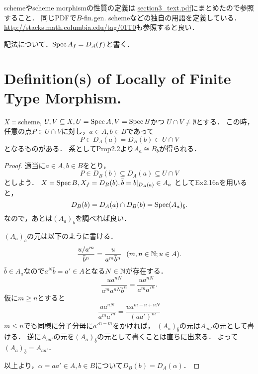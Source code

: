 \documentclass[a4paper]{jsarticle}
\begin{document}
    schemeやscheme morphismの性質の定義は
    \url{section3_text.pdf}にまとめたので参照すること．
    同じPDFで$B$-fin.gen. schemeなどの独自の用語を定義している．
    \url{http://stacks.math.columbia.edu/tag/01T0}も参照すると良い．

    記法について．$\operatorname{Spec} A_f=D_A(f)$と書く．

\section{Definition(s) of Locally of Finite Type Morphism.} %

\begin{Lemma}
    $X$ :: scheme, $U,V \subseteq X, U=\operatorname{Spec} A, V=\operatorname{Spec} B$かつ
    $U \cap V \neq \emptyset$とする．
    この時，任意の点$P \in U \cap V$に対し，$a \in A, b \in B$であって
    \[ P \in D_A(a)=D_B(b) \subset U \cap V \]となるものがある．
    系としてProp2.2より$A_a \cong B_b$が得られる．
\end{Lemma}
\begin{proof}
    適当に$a \in A, b \in B$をとり，
     \[ P \in D_B(b) \subseteq D_A(a) \subseteq U \cap V \]
    としよう．
    $X=\operatorname{Spec} B, X_f=D_B(b), \bar{b}=b|_{D_A(a)} \in A_a$
    としてEx2.16aを用いると，
    \[ D_B(b)=D_A(a) \cap D_B(b)=\operatorname{Spec} (A_a)_{\bar{b}}. \]
    なので，あとは$(A_a)_{\bar{b}}$を調べれば良い．

    $(A_a)_{\bar{b}}$の元は以下のように書ける．
    \[ \frac{u/a^m}{\bar{b}^n}=\frac{u}{a^m\bar{b}^n} ~~(m,n \in \mathbb{N}; u \in A). \]
    $\bar{b} \in A_a$なので$a^N\bar{b}=a' \in A$となる$N \in \mathbb{N}$が存在する．
    \[ \frac{u a^{nN}}{a^m a^{nN}\bar{b}^n}=\frac{u a^{nN}}{a^m a'^{n}}. \]
    仮に$m \geq n$とすると
    \[ \frac{u a^{nN}}{a^m a'^{n}}=\frac{ua^{m-n+nN}}{(aa')^m} \]
    $m \leq n$でも同様に分子分母に$a'^{n-m}$をかければ，
    $(A_a)_{\bar{b}}$の元は$A_{aa'}$の元として書ける．
    逆に$A_{aa'}$の元を$(A_a)_{\bar{b}}$の元として書くことは直ちに出来る．
    よって$(A_a)_{\bar{b}}=A_{aa'}$．

    以上より，$\alpha=aa' \in A, b \in B$について$D_B(b)=D_A(\alpha)$．
\end{proof}
\end{document}
